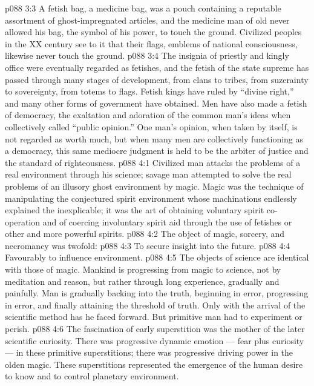 \vs p088 3:3 A fetish bag, a medicine bag, was a pouch containing a reputable assortment of ghost\hyp{}impregnated articles, and the medicine man of old never allowed his bag, the symbol of his power, to touch the ground. Civilized peoples in the XX century see to it that their flags, emblems of national consciousness, likewise never touch the ground.
\vs p088 3:4 The insignia of priestly and kingly office were eventually regarded as fetishes, and the fetish of the state supreme has passed through many stages of development, from clans to tribes, from suzerainty to sovereignty, from totems to flags. Fetish kings have ruled by “divine right,” and many other forms of government have obtained. Men have also made a fetish of democracy, the exaltation and adoration of the common man’s ideas when collectively called “public opinion.” One man’s opinion, when taken by itself, is not regarded as worth much, but when many men are collectively functioning as a democracy, this same mediocre judgment is held to be the arbiter of justice and the standard of righteousness.
\vs p088 4:1 Civilized man attacks the problems of a real environment through his science; savage man attempted to solve the real problems of an illusory ghost environment by magic. Magic was the technique of manipulating the conjectured spirit environment whose machinations endlessly explained the inexplicable; it was the art of obtaining voluntary spirit co\hyp{}operation and of coercing involuntary spirit aid through the use of fetishes or other and more powerful spirits.
\vs p088 4:2 The object of magic, sorcery, and necromancy was twofold:
\vs p088 4:3 \bibnobreakspace To secure insight into the future.
\vs p088 4:4 \bibnobreakspace Favourably to influence environment.
\vs p088 4:5 \pc The objects of science are identical with those of magic. Mankind is progressing from magic to science, not by meditation and reason, but rather through long experience, gradually and painfully. Man is gradually backing into the truth, beginning in error, progressing in error, and finally attaining the threshold of truth. Only with the arrival of the scientific method has he faced forward. But primitive man had to experiment or perish.
\vs p088 4:6 The fascination of early superstition was the mother of the later scientific curiosity. There was progressive dynamic emotion --- fear plus curiosity --- in these primitive superstitions; there was progressive driving power in the olden magic. These superstitions represented the emergence of the human desire to know and to control planetary environment.
